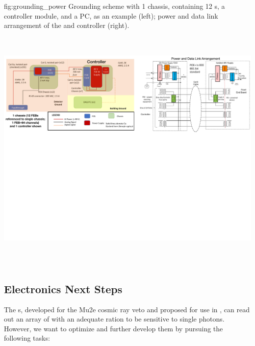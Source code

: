 \begin{dunefigure}
 {fig:grounding_power}
 {Grounding scheme with 1 chassis, containing 12 s, a controller module, and a  PC, as an example (left); power and data link arrangement of the  and controller (right).}
\includegraphics[height=5.0in]{graphics/pds-grounding-power.pdf} 
\vspace{-7.1cm}
\end{dunefigure}

\subsection{Electronics Next Steps}
\label{subsec:pds-fe-next}


The s, developed for the Mu2e cosmic ray veto and proposed for use in , can read out an array of  with an adequate  ration to be sensitive to single photons. However, we want to optimize and further develop them by pursuing the following tasks:

